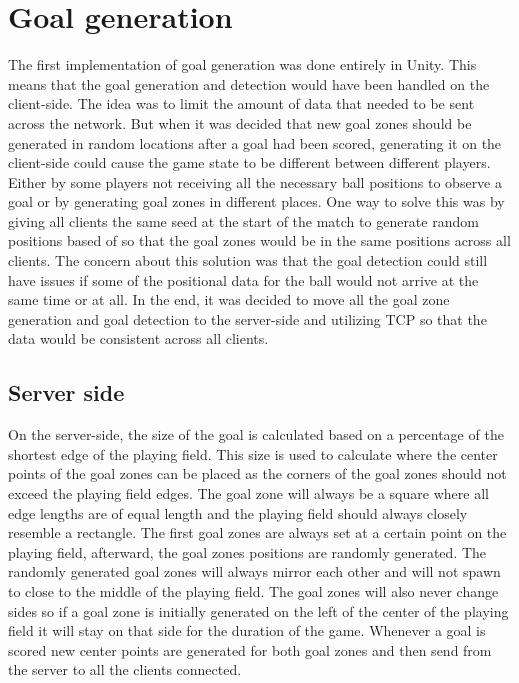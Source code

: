 \section{Goal generation}\label{subsec:goalrefactoring}
The first implementation of goal generation was done entirely in Unity.
This means that the goal generation and detection would have been handled on the client-side.
The idea was to limit the amount of data that needed to be sent across the network.
But when it was decided that new goal zones should be generated in random locations after a goal had been scored, generating it on the client-side could cause the game state to be different between different players.
Either by some players not receiving all the necessary ball positions to observe a goal or by generating goal zones in different places.
One way to solve this was by giving all clients the same seed at the start of the match to generate random positions based of so that the goal zones would be in the same positions across all clients.
The concern about this solution was that the goal detection could still have issues if some of the positional data for the ball would not arrive at the same time or at all.
In the end, it was decided to move all the goal zone generation and goal detection to the server-side and utilizing TCP so that the data would be consistent across all clients.

\subsection{Server side}
On the server-side, the size of the goal is calculated based on a percentage of the shortest edge of the playing field.
This size is used to calculate where the center points of the goal zones can be placed as the corners of the goal zones should not exceed the playing field edges.
The goal zone will always be a square where all edge lengths are of equal length and the playing field should always closely resemble a rectangle.
The first goal zones are always set at a certain point on the playing field, afterward, the goal zones positions are randomly generated.
The randomly generated goal zones will always mirror each other and will not spawn to close to the middle of the playing field.
The goal zones will also never change sides so if a goal zone is initially generated on the left of the center of the playing field it will stay on that side for the duration of the game.
Whenever a goal is scored new center points are generated for both goal zones and then send from the server to all the clients connected.

